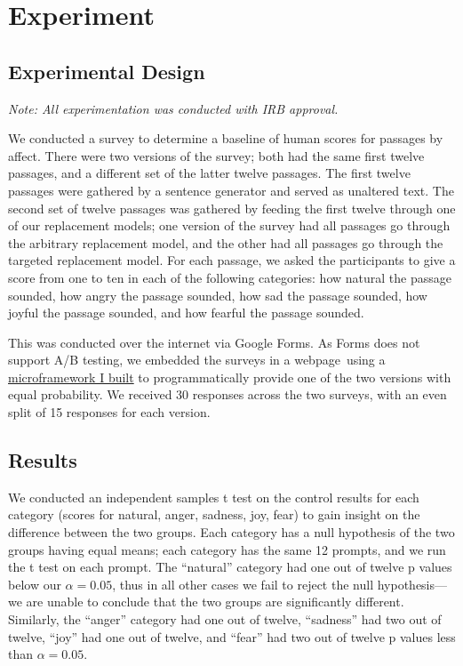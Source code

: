 \documentclass[11pt, twoside, reqno]{book}
\begin{document}
\startmain
\chapter{Experiment}

\section{Experimental Design}

\textit{Note: All experimentation was conducted with IRB approval.}

We conducted a survey to determine a baseline of human scores for passages by affect. There were two versions of the survey; both had the same first twelve passages, and a different set of the latter twelve passages. The first twelve passages were gathered by a sentence generator and served as unaltered text. The second set of twelve passages was gathered by feeding the first twelve through one of our replacement models; one version of the survey had all passages go through the arbitrary replacement model, and the other had all passages go through the targeted replacement model. For each passage, we asked the participants to give a score from one to ten in each of the following categories: how natural the passage sounded, how angry the passage sounded, how sad the passage sounded, how joyful the passage sounded, and how fearful the passage sounded.

This was conducted over the internet via Google Forms. As Forms does not support A/B testing, we embedded the surveys in a webpage using a \href{https://github.com/colehollant/quarantine-js}{microframework I built} to programmatically provide one of the two versions with equal probability. We received 30 responses across the two surveys, with an even split of 15 responses for each version.

\section{Results}

We conducted an independent samples t test on the control results for each category (scores for natural, anger, sadness, joy, fear) to gain insight on the difference between the two groups. Each category has a null hypothesis of the two groups having equal means; each category has the same 12 prompts, and we run the t test on each prompt. The ``natural'' category had one out of twelve p values below our $\alpha = 0.05$, thus in all other cases we fail to reject the null hypothesis—we are unable to conclude that the two groups are significantly different. Similarly, the ``anger'' category had one out of twelve, ``sadness'' had two out of twelve, ``joy'' had one out of twelve, and ``fear'' had two out of twelve p values less than $\alpha = 0.05$.
\end{document}
